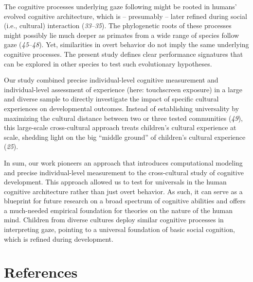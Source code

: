 \documentclass[
  man,floatsintext]{apa6}
\begin{document}
The cognitive processes underlying gaze following might be rooted in humans' evolved cognitive architecture, which is -- presumably -- later refined during social (i.e., cultural) interaction (\emph{33}--\emph{35}). The phylogenetic roots of these processes might possibly lie much deeper as primates from a wide range of species follow gaze (\emph{45}--\emph{48}). Yet, similarities in overt behavior do not imply the same underlying cognitive processes. The present study defines clear performance signatures that can be explored in other species to test such evolutionary hypotheses.

Our study combined precise individual-level cognitive measurement and individual-level assessment of experience (here: touchscreen exposure) in a large and diverse sample to directly investigate the impact of specific cultural experiences on developmental outcomes. Instead of establishing universality by maximizing the cultural distance between two or three tested communities (\emph{49}), this large-scale cross-cultural approach treats children's cultural experience at scale, shedding light on the big ``middle ground'' of children's cultural experience (\emph{25}).

In sum, our work pioneers an approach that introduces computational modeling and precise individual-level measurement to the cross-cultural study of cognitive development. This approach allowed us to test for universals in the human cognitive architecture rather than just overt behavior. As such, it can serve as a blueprint for future research on a broad spectrum of cognitive abilities and offers a much-needed empirical foundation for theories on the nature of the human mind. Children from diverse cultures deploy similar cognitive processes in interpreting gaze, pointing to a universal foundation of basic social cognition, which is refined during development.

\newpage

\hypertarget{references}{%
\section{References}\label{references}}
\end{document}
